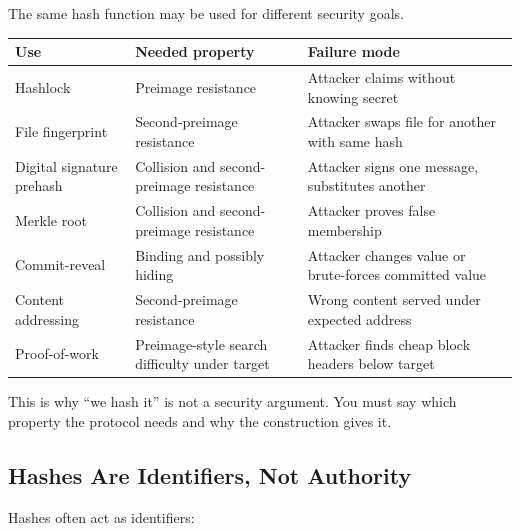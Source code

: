 The same hash function may be used for different security goals.

{\def\LTcaptype{none} %
\begin{longtable}[]{@{}
  >{\raggedright\arraybackslash}p{}
  >{\raggedright\arraybackslash}p{}
  >{\raggedright\arraybackslash}p{}@{}}
\toprule\noalign{}
\begin{minipage}[b]{\linewidth}\raggedright
Use
\end{minipage} & \begin{minipage}[b]{\linewidth}\raggedright
Needed property
\end{minipage} & \begin{minipage}[b]{\linewidth}\raggedright
Failure mode
\end{minipage} \\
\midrule\noalign{}
\endhead
\bottomrule\noalign{}
\endlastfoot
Hashlock & Preimage resistance & Attacker claims without knowing
secret \\
File fingerprint & Second-preimage resistance & Attacker swaps file for
another with same hash \\
Digital signature prehash & Collision and second-preimage resistance &
Attacker signs one message, substitutes another \\
Merkle root & Collision and second-preimage resistance & Attacker proves
false membership \\
Commit-reveal & Binding and possibly hiding & Attacker changes value or
brute-forces committed value \\
Content addressing & Second-preimage resistance & Wrong content served
under expected address \\
Proof-of-work & Preimage-style search difficulty under target & Attacker
finds cheap block headers below target \\
\end{longtable}
}

This is why ``we hash it'' is not a security argument. You must say
which property the protocol needs and why the construction gives it.

\subsection{Hashes Are Identifiers, Not Authority}

Hashes often act as identifiers:

